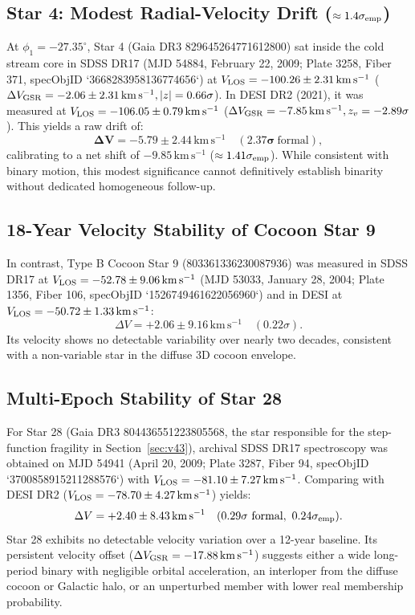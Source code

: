 \documentclass[twocolumn]{aastex631}
\begin{document}
\subsection{Star 4: Modest Radial-Velocity Drift ($\approx 1.4\sigma_{\rm emp}$)}
At $\phi_1 = -27.35^\circ$, Star 4 (Gaia DR3 829645264771612800) sat inside the cold stream core in SDSS DR17 (MJD 54884, February 22, 2009; Plate 3258, Fiber 371, specObjID `3668283958136774656`) at $V_{\rm LOS} = -100.26 \pm 2.31\,\mathrm{km\,s^{-1}}$ ($\Delta V_{\rm GSR} = -2.06 \pm 2.31\,\mathrm{km\,s^{-1}}, |z| = 0.66\sigma$). In DESI DR2 (2021), it was measured at $V_{\rm LOS} = -106.05 \pm 0.79\,\mathrm{km\,s^{-1}}$ ($\Delta V_{\rm GSR} = -7.85\,\mathrm{km\,s^{-1}}, z_v = -2.89\sigma$). This yields a raw drift of:
\begin{equation}
\mathbf{\Delta V = -5.79 \pm 2.44\,\mathrm{km\,s^{-1}} \quad (2.37\sigma\ \mathrm{formal})},
\end{equation}
calibrating to a net shift of $-9.85\,\mathrm{km\,s^{-1}}$ ($\approx 1.41\sigma_{\rm emp}$). While consistent with binary motion, this modest significance cannot definitively establish binarity without dedicated homogeneous follow-up.

\subsection{18-Year Velocity Stability of Cocoon Star 9}
In contrast, Type B Cocoon Star 9 (803361336230087936) was measured in SDSS DR17 at $V_{\rm LOS} = -52.78 \pm 9.06\,\mathrm{km\,s^{-1}}$ (MJD 53033, January 28, 2004; Plate 1356, Fiber 106, specObjID `1526749461622056960`) and in DESI at $V_{\rm LOS} = -50.72 \pm 1.33\,\mathrm{km\,s^{-1}}$:
\begin{equation}
\Delta V = +2.06 \pm 9.16\,\mathrm{km\,s^{-1}} \quad (0.22\sigma).
\end{equation}
Its velocity shows no detectable variability over nearly two decades, consistent with a non-variable star in the diffuse 3D cocoon envelope.

\subsection{Multi-Epoch Stability of Star 28}
For Star 28 (Gaia DR3 804436551223805568, the star responsible for the step-function fragility in Section~\ref{sec:v43}), archival SDSS DR17 spectroscopy was obtained on MJD 54941 (April 20, 2009; Plate 3287, Fiber 94, specObjID `3700858915211288576`) with $V_{\rm LOS} = -81.10 \pm 7.27\,\mathrm{km\,s^{-1}}$. Comparing with DESI DR2 ($V_{\rm LOS} = -78.70 \pm 4.27\,\mathrm{km\,s^{-1}}$) yields:
\begin{equation}
\Delta V = +2.40 \pm 8.43\,\mathrm{km\,s^{-1}} \quad (0.29\sigma\ \mathrm{formal},\ 0.24\sigma_{\rm emp}).
\end{equation}
Star 28 exhibits no detectable velocity variation over a 12-year baseline. Its persistent velocity offset ($\Delta V_{\rm GSR} = -17.88\,\mathrm{km\,s^{-1}}$) suggests either a wide long-period binary with negligible orbital acceleration, an interloper from the diffuse cocoon or Galactic halo, or an unperturbed member with lower real membership probability.
\end{document}
